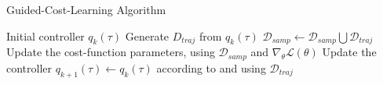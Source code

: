\begin{algorithm}[htbp]
\caption{Guided-Cost-Learning Algorithm \cite{finn2016guided_cost_learning}}
\label{alg:guided_cost_learning}
\begin{algorithmic}
\Require Initial controller $q_{k}(\tau)$ 
    \State Generate $D_{traj}$ from $q_{k}(\tau)$
    \State $\mathcal{D}_{samp} \leftarrow \mathcal{D}_{samp} \bigcup \mathcal{D}_{traj}$
    \State Update the cost-function parameters, using $\mathcal{D}_{samp}$ and $\nabla_{\theta}\mathcal{L(\theta)}$
    \State Update the controller $q_{k+1}(\tau) \leftarrow q_{k}(\tau)$ according to \cite{levine2014lqr_flm} and using $\mathcal{D}_{traj}$
\EndFor
\end{algorithmic}
\end{algorithm}
